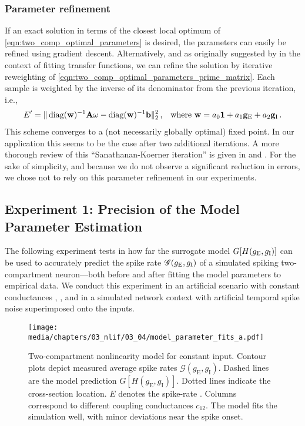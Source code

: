 \subsubsection{Parameter refinement}
If an exact solution in terms of the closest local optimum of \cref{eqn:two_comp_optimal_parameters} is desired, the parameters can easily be refined using gradient descent.
Alternatively, and as originally suggested by \citet{sanathanan1963transfer} in the context of fitting transfer functions, we can refine the solution by iterative reweighting of \cref{eqn:two_comp_optimal_parameters_prime_matrix}.
Each sample is weighted by the inverse of its denominator from the previous iteration, i.e.,
\begin{align}
	E' &= \|\operatorname{\mathrm{diag}}(\mathbf{w})^{-1} \mathbf{A} \mathbf{\omega} - \operatorname{\mathrm{diag}}(\mathbf{w})^{-1}\mathbf{b} \|_2^2 \,, & \text{where } \mathbf{w} = a_0 \mathbf{1} + a_1 \mathbf{g}_\mathrm{E} + a_2 \mathbf{g}_\mathrm{I} \,.
	\label{eqn:sanathanan_koerner}
\end{align}
This scheme converges to a (not necessarily globally optimal) fixed point.
In our application this seems to be the case after two additional iterations.
A more thorough review of this \enquote{Sanathanan-Koerner iteration} is given in \citet[Section~2.2]{hokanson2018least} and \citet{pintelon1994parametric}.
For the sake of simplicity, and because we do not observe a significant reduction in errors, we chose not to rely on this parameter refinement in our experiments.

\subsection{Experiment 1: Precision of the Model Parameter Estimation}
\label{sec:two_comp_lif_experiment_1}

The following experiment tests in how far the surrogate model $G[H(g_\mathrm{E}, g_\mathrm{I})]$ can be used to accurately predict the spike rate $\mathscr{G}(g_\mathrm{E}, g_\mathrm{I})$ of a simulated spiking two-compartment \LIF neuron---both before and after fitting the model parameters to empirical data.
We conduct this experiment in an artificial scenario with constant conductances \gE, \gI, and in a simulated network context with artificial temporal spike noise superimposed onto the inputs.

\begin{figure}[t]
	\texttt{[image: media/chapters/03\_nlif/03\_04/model\_parameter\_fits\_a.pdf]}%
	{\label{fig:synaptic_nonlinearity_fit_a_a}}%
	{\label{fig:synaptic_nonlinearity_fit_a_b}}%
	\caption[Two-compartment nonlinearity model for constant input]{
		Two-compartment nonlinearity model for constant input. Contour plots depict measured average spike rates $\mathscr{G}(g_\mathrm{E}, g_\mathrm{I})$.
		Dashed lines are the model prediction $G[H(g_\mathrm{E}, g_\mathrm{I})]$. Dotted lines indicate the cross-section location.
		$E$ denotes the spike-rate \RMSE.
		Columns correspond to different coupling conductances $c_\mathrm{12}$.
		The model fits the simulation well, with minor deviations near the spike onset.}
	\label{fig:synaptic_nonlinearity_fit_a}%
\end{figure}


